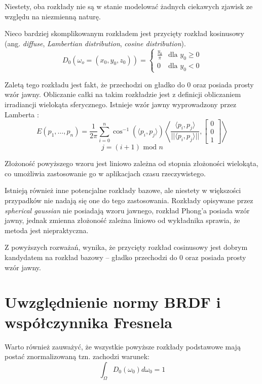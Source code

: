 \documentclass[../main.tex]{subfiles}
\begin{document}
Niestety, oba rozkłady nie są w stanie modelować żadnych ciekawych zjawisk
ze względu na niezmienną naturę.

Nieco bardziej skomplikowanym rozkładem jest przycięty rozkład kosinusowy (ang.
\textit{diffuse}, \textit{Lambertian distribution}, \textit{cosine
distribution}).
\[
D_0(\omega_o=(x_0, y_0, z_0)) = \begin{cases}
  \frac{y_0}{\pi} & \text{dla } y_0 \geq 0 \\
  0 & \text{dla } y_0 < 0
\end{cases}
\]

Zaletą tego rozkładu jest fakt, że przechodzi on gładko do 0 oraz posiada
prosty wzór jawny. Obliczanie całki na takim rozkładzie jest z definicji
obliczaniem irradiancji wielokąta sferycznego. Istnieje wzór jawny
wyprowadzony przez Lamberta \cite{Baum}:
\[
E(p_1, \ldots, p_n) =
\frac{1}{2\pi}
\sum_{i=0}^{n} {
  \cos^{-1}(\langle p_i, p_j \rangle)
  \left\langle {
    \frac{\langle p_i, p_j \rangle}{||\langle p_i, p_j \rangle||},
    \left[ \begin{matrix} 0 \\ 0 \\ 1 \end{matrix} \right]
  } \right\rangle
}
\]
\[
j = (i+1) \text{ mod } n
\]

Złożoność powyższego wzoru jest liniowo zależna od stopnia złożoności
wielokąta, co umożliwia zastosowanie go w aplikacjach czasu rzeczywistego.

Istnieją również inne potencjalne rozkłady bazowe, ale niestety
w większości przypadków nie nadają się one do tego zastosowania. Rozkłady
opisywane przez \textit{spherical gaussian} nie posiadają wzoru jawnego, rozkład
Phong’a posiada wzór jawny, jednak zmienna złożoność zależna liniowo od
wykładnika sprawia, że metoda jest niepraktyczna.


Z powyższych rozważań, wynika, że przycięty rozkład cosinusowy jest dobrym
kandydatem na rozkład bazowy – gładko przechodzi do 0 oraz posiada prosty
wzór jawny.

\section{Uwzględnienie  normy BRDF i współczynnika Fresnela}

Warto również zauważyć, że wszystkie powyższe rozkłady podstawowe mają
postać znormalizowaną tzn. zachodzi warunek:
\[
\int_\Omega {
    D_0(\omega_0)
    d \omega_0
} = 1
\]
\end{document}
